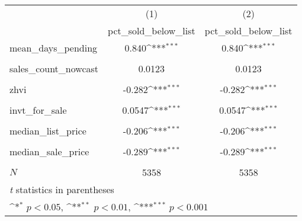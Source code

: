 {
\def\sym#1{\ifmmode^{#1}\else\(^{#1}\)\fi}
\begin{tabular}{l*{2}{c}}
\hline\hline
            &\multicolumn{1}{c}{(1)}&\multicolumn{1}{c}{(2)}\\
            &\multicolumn{1}{c}{pct\_sold\_below\_list}&\multicolumn{1}{c}{pct\_sold\_below\_list}\\
\hline
mean\_days\_pending&       0.840\sym{***}&       0.840\sym{***}\\
            &                     &                     \\
[1em]
sales\_count\_nowcast&      0.0123         &      0.0123         \\
            &                     &                     \\
[1em]
zhvi        &      -0.282\sym{***}&      -0.282\sym{***}\\
            &                     &                     \\
[1em]
invt\_for\_sale&      0.0547\sym{***}&      0.0547\sym{***}\\
            &                     &                     \\
[1em]
median\_list\_price&      -0.206\sym{***}&      -0.206\sym{***}\\
            &                     &                     \\
[1em]
median\_sale\_price&      -0.289\sym{***}&      -0.289\sym{***}\\
            &                     &                     \\
\hline
\(N\)       &        5358         &        5358         \\
\hline\hline
\multicolumn{3}{l}{\footnotesize \textit{t} statistics in parentheses}\\
\multicolumn{3}{l}{\footnotesize \sym{*} \(p<0.05\), \sym{**} \(p<0.01\), \sym{***} \(p<0.001\)}\\
\end{tabular}
}
